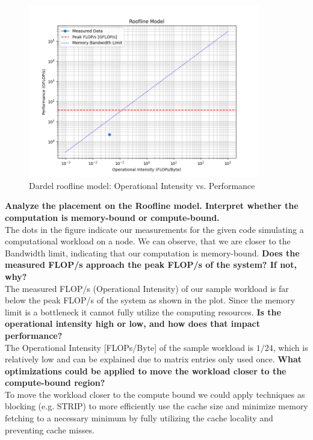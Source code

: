 \documentclass[a4paper,10pt]{article}
\begin{document}
\begin{figure}[H]
  \centering
  \includegraphics[width=0.9\textwidth]{img/roofline_model.png}
  \caption{Dardel roofline model: Operational Intensity vs. Performance}
  \label{fig:roofline}
\end{figure}

\textbf{Analyze the placement on the Roofline model. Interpret whether the computation is memory-bound or compute-bound.}\\
The dots in the figure indicate our measurements for the given code simulating a computational workload
on a node. We can observe, that we are closer to the Bandwidth limit, indicating that our computation is 
memory-bound. 
\textbf{Does the measured FLOP/s approach the peak FLOP/s of the system? If not, why?}\\
The measured FLOP/s (Operational Intensity) of our sample workload is far below the peak FLOP/s of the system as shown in the plot. Since the memory limit is a bottleneck it cannot
fully utilize the computing resources.
\textbf{Is the operational intensity high or low, and how does that impact performance?}\\
The Operational Intensity [FLOPs/Byte] of the sample workload is $1/24$, which is relatively low and can be explained due to matrix entries only used once.
\textbf{What optimizations could be applied to move the workload closer to the compute-bound region?}\\
To move the workload closer to the compute bound we could apply techniques as blocking (e.g. STRIP) to more efficiently use
the cache size and minimize memory fetching to a necessary minimum by fully utilizing the cache locality and preventing cache misses.
\end{document}
